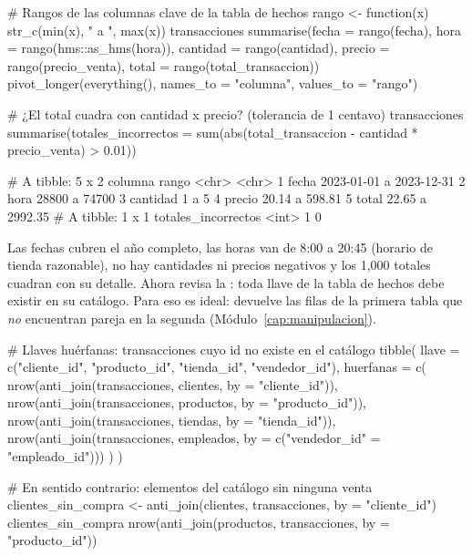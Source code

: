 \begin{rcode}
# Rangos de las columnas clave de la tabla de hechos
rango <- function(x) str_c(min(x), " a ", max(x))
transacciones %
  summarise(fecha    = rango(fecha),
            hora     = rango(hms::as_hms(hora)),
            cantidad = rango(cantidad),
            precio   = rango(precio_venta),
            total    = rango(total_transaccion)) %
  pivot_longer(everything(), names_to = "columna",
               values_to = "rango")

# ¿El total cuadra con cantidad x precio? (tolerancia de 1 centavo)
transacciones %
  summarise(totales_incorrectos =
              sum(abs(total_transaccion - cantidad * precio_venta) > 0.01))
\end{rcode}

\begin{rsalida}
# A tibble: 5 x 2
  columna  rango                  
  <chr>    <chr>                  
1 fecha    2023-01-01 a 2023-12-31
2 hora     28800 a 74700          
3 cantidad 1 a 5                  
4 precio   20.14 a 598.81         
5 total    22.65 a 2992.35        
# A tibble: 1 x 1
  totales_incorrectos
                <int>
1                   0
\end{rsalida}

Las fechas cubren el año completo, las horas van de 8:00 a 20:45 (horario de
tienda razonable), no hay cantidades ni precios negativos y los 1,000 totales
cuadran con su detalle. Ahora revisa la :
toda llave de la tabla de hechos debe existir en su catálogo. Para eso
 es ideal: devuelve las filas de la primera tabla que
\emph{no} encuentran pareja en la segunda (Módulo~\ref{cap:manipulacion}).

\begin{rcode}
# Llaves huérfanas: transacciones cuyo id no existe en el catálogo
tibble(
  llave = c("cliente_id", "producto_id", "tienda_id", "vendedor_id"),
  huerfanas = c(
    nrow(anti_join(transacciones, clientes,  by = "cliente_id")),
    nrow(anti_join(transacciones, productos, by = "producto_id")),
    nrow(anti_join(transacciones, tiendas,   by = "tienda_id")),
    nrow(anti_join(transacciones, empleados,
                   by = c("vendedor_id" = "empleado_id")))
  )
)

# En sentido contrario: elementos del catálogo sin ninguna venta
clientes_sin_compra <- anti_join(clientes, transacciones,
                                 by = "cliente_id")
clientes_sin_compra %
nrow(anti_join(productos, transacciones, by = "producto_id"))
\end{rcode}

